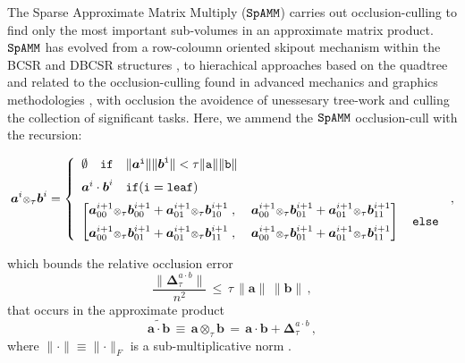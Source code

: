 \documentclass[letterpaper,twocolumn,amsmath,amsfont,amssymb,english,aps,jcp,preprintnumbers,groupaddress,nofootinbib,tightenlines,floatfix]{revtex4}
\newcommand{\mat}[1]{\boldsymbol{#1}}
\newcommand{\ot}{  {\scriptstyle \otimes}_{ \tau } }
\theoremstyle{plain}
\theoremstyle{remark}
\theoremstyle{plain}
\begin{document}
The Sparse Approximate Matrix Multiply ($\tt SpAMM$) carries out occlusion-culling to find only the
most important sub-volumes in an approximate matrix product. 
$\tt SpAMM$ has evolved from a row-coloumn oriented skipout mechanism within the
BCSR and DBCSR structures \cite{challacombe1999simplified,Challacombe:2000:SpMM}, 
to hierachical approaches based on the quadtree and related to 
the occlusion-culling found in advanced mechanics and graphics methodologies \cite{Challacombe2010}, 
with occlusion the avoidence of unessesary tree-work and culling the collection of significant tasks. 
Here, we ammend the $\tt SpAMM$ occlusion-cull with the recursion:
\begin{widetext}
\begin{equation}
\mat{a}^{i} \ot \mat{b}^{i} =
\left\{
        \begin{array}{ll}
                 \emptyset \quad \tt{if}\quad \lVert \mat{a}^i \rVert \lVert \mat{b}^i \rVert < \tau \lVert a \rVert \lVert b \rVert \\[0.2cm]
                 \mat{a} ^i \cdot \mat{b}^i \quad  \tt{if}(i=\tt{leaf}) \\[0.2cm]
\begin{bmatrix} \mat{a}^{i+1}_{00} \ot \mat{b}^{i+1}_{00} +\mat{a}^{i+1}_{01} \ot \mat{b}^{i+1}_{10} \; , \; &
                \mat{a}^{i+1}_{00} \ot \mat{b}^{i+1}_{01} +\mat{a}^{i+1}_{01} \ot \mat{b}^{i+1}_{11}  \\[0.2cm]
                \mat{a}^{i+1}_{00} \ot \mat{b}^{i+1}_{01} +\mat{a}^{i+1}_{01} \ot \mat{b}^{i+1}_{11} \; , \; &
                \mat{a}^{i+1}_{00} \ot \mat{b}^{i+1}_{01} +\mat{a}^{i+1}_{01} \ot \mat{b}^{i+1}_{11}
\end{bmatrix}  \quad \tt{else}
                \end{array}
              \right.  \, ,
\end{equation}
\end{widetext}
which bounds the relative occlusion error
\begin{equation}\label{bound}
\frac{\lVert \mat{\Delta}^{a \cdot b}_{\tau} \rVert}{n^2 }  \, \leq \, \tau \, \lVert \mat{a} \rVert  \,  \lVert \mat{b} \rVert \, ,
\end{equation}
that occurs in the approximate product
\begin{equation}
\widetilde{\mat{a}\cdot \mat{b}} \,  \equiv \, \mat{a} \ot \mat{b} \,
  = \, \mat{a} \cdot \mat{b} + \mat{\Delta}^{a \cdot b}_{\tau} \, ,
\end{equation}
where $\lVert \cdot \rVert \equiv \lVert \cdot \rVert_F$ is a sub-multiplicative norm \cite{}.
\end{document}
